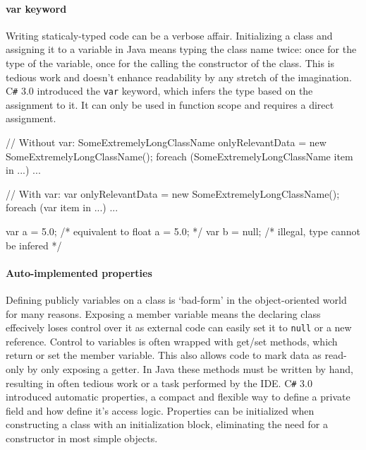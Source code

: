 \documentclass[twoside,openright]{uva-bachelor-thesis}
\newcommand{\code}[1]{\texttt{\footnotesize#1}}
\newcommand{\cs}{C\texttt{\#}\xspace}
\begin{document}
		\paragraph{var keyword}
			Writing staticaly-typed code can be a verbose affair. Initializing a class and assigning it to a variable in Java means typing the class name twice: once for the type of the variable, once for the calling the constructor of the class. This is tedious work and doesn't enhance readability by any stretch of the imagination. \cs 3.0 introduced the \code{var} keyword, which infers the type based on the assignment to it. It can only be used in function scope and requires a direct assignment.
			
			\begin{codespan}
				\begin{csharpcode}
					// Without var:
					SomeExtremelyLongClassName onlyRelevantData = new SomeExtremelyLongClassName();
					foreach (SomeExtremelyLongClassName item in ...)
						...
					
					// With var:
					var onlyRelevantData = new SomeExtremelyLongClassName();
					foreach (var item in ...)
						...
						
					var a = 5.0;        /* equivalent to float a = 5.0; */
					var b = null;       /* illegal, type cannot be infered */
				\end{csharpcode}
			\end{codespan}
			
		\paragraph{Auto-implemented properties}
			Defining publicly variables on a class is `bad-form' in the object-oriented world for many reasons. Exposing a member variable means the declaring class effecively loses control over it as external code can easily set it to \code{null} or a new reference. Control to variables is often wrapped with get/set methods, which return or set the member variable. This also allows code to mark data as read-only by only exposing a getter. In Java these methods must be written by hand, resulting in often tedious work or a task performed by the IDE. \cs 3.0 introduced automatic properties, a compact and flexible way to define a private field and how define it's access logic. Properties can be initialized when constructing a class with an initialization block, eliminating the need for a constructor in most simple objects.
			
\end{document}
